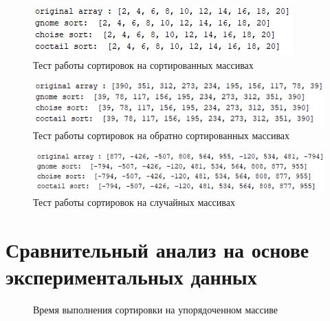 \documentclass[a4paper,12pt]{report}
\begin{document}
        \begin{figure}[h!]
        	\centering
        	\includegraphics[width=0.9\linewidth]{test_sorted.jpg}
        	\caption{Тест работы сортировок на сортированных массивах}
        	\label{ris:test1}
        \end{figure}
        
        \begin{figure}[h!]
        	\centering
        	\includegraphics[width=0.9\linewidth]{test_reverse.jpg}
        	\caption{Тест работы сортировок на обратно сортированных массивах}
        	\label{ris:test2}
        \end{figure}
    
    	\begin{figure}[h!]
    		\centering
    		\includegraphics[width=0.9\linewidth]{test_random.jpg}
    		\caption{Тест работы сортировок на случайных массивах}
    		\label{ris:test3}
    	\end{figure}
    
        \newpage
        
    \section{Сравнительный анализ на основе экспериментальных данных}
        
        \begin{figure}[h!]
        \label{graph:sort}
        \caption{Время выполнения сортировки на упорядоченном массиве}
        \end{figure}
        
\end{document}
